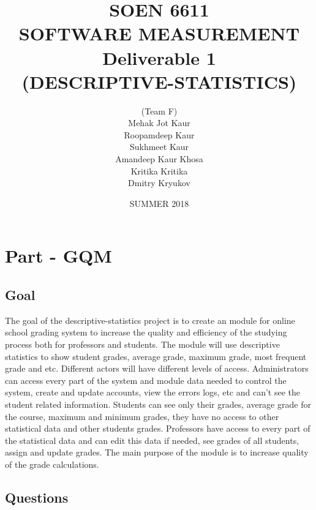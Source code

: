 \documentclass[12pt]{article}
\title{SOEN 6611 \\ SOFTWARE MEASUREMENT \\ Deliverable 1 \\
(DESCRIPTIVE-STATISTICS)}
\date{SUMMER 2018}
\author{(Team F)\\ 
Mehak Jot Kaur\\
Roopamdeep Kaur\\
Sukhmeet Kaur\\
Amandeep Kaur Khosa\\
Kritika Kritika\\
Dmitry Kryukov
}
\begin{document}
            
\maketitle                  
\newpage
\section{Part - GQM}      
\subsection{Goal}

The goal of the descriptive-statistics project is to create an module for online school grading system to increase the quality and efficiency of the studying process both for professors and students. The module will use descriptive statistics to show student grades, average grade, maximum grade, most frequent grade and etc. Different actors will have different levels of access. Administrators can access every part of the system and module data needed to control the system, create and update accounts, view the errors logs, etc and can't see the student related information. Students can see only their grades, average grade for the course, maximum and minimum grades, they have no access to other statistical data and other students grades. Professors have access to every part of the statistical data and can edit this data if needed, see grades of all students, assign and update grades. The main purpose of the module is to increase quality of the grade calculations.\cite{GQM} \cite{GQM-approach} \cite{GQM-wiki}

\subsection{Questions}
\end{document}

